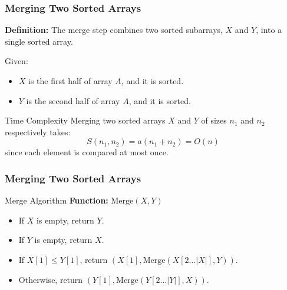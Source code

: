 \begin{frame}
    \frametitle{Merging Two Sorted Arrays}
    
    \textbf{Definition:} The merge step combines two sorted subarrays, \( X \) and \( Y \), into a single sorted array.

    \begin{block}{Given:}
        \begin{itemize}
            \item \( X \) is the first half of array \( A \), and it is sorted.
            \item \( Y \) is the second half of array \( A \), and it is sorted.
        \end{itemize}
    \end{block}

    \begin{alertblock}{Time Complexity}
        Merging two sorted arrays \( X \) and \( Y \) of sizes \( n_1 \) and \( n_2 \) respectively takes:
        \[
        S(n_1, n_2) = a(n_1 + n_2) = O(n)
        \]
        since each element is compared at most once.
    \end{alertblock}



\end{frame}


\begin{frame}
\frametitle{Merging Two Sorted Arrays}
\begin{block}{Merge Algorithm}
        \textbf{Function:} \( \text{Merge}(X, Y) \)
        \begin{itemize}
            \item If \( X \) is empty, return \( Y \).
            \item If \( Y \) is empty, return \( X \).
            \item If \( X[1] \leq Y[1] \), return \( (X[1], \text{Merge}(X[2 \dots |X|], Y)) \).
            \item Otherwise, return \( (Y[1], \text{Merge}(Y[2 \dots |Y|], X)) \).
        \end{itemize}
    \end{block}
    
\end{frame}

